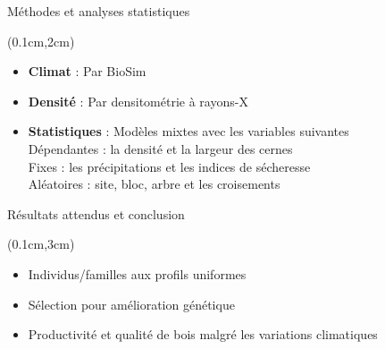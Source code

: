 \documentclass{beamer}
\begin{document}

\begin{frame}{Méthodes et analyses statistiques}
	
\begin{textblock*}{12cm}(0.1cm,2cm)
	\begin{itemize} %
		\item \textbf{Climat} : Par BioSim \\
		\vspace{0.5cm}
		\item \textbf{Densité} : Par densitométrie à rayons-X  \\
		\vspace{0.5cm}
		\item \textbf{Statistiques} : Modèles mixtes avec les variables suivantes\\
		\vspace{0.2cm}
		Dépendantes : la densité et la largeur des cernes\\
		\vspace{0.2cm}
		Fixes : les précipitations et les indices de sécheresse \\
		\vspace{0.2cm}
        Aléatoires : site, bloc, arbre et les croisements
		
	\end{itemize}
\end{textblock*}
	
\end{frame}

\begin{frame}{Résultats attendus et conclusion}
	
	\begin{textblock*}{12cm}(0.1cm,3cm)
		\begin{itemize} %
			\item Individus/familles aux profils uniformes \\
			\vspace{0.7cm}
			\item Sélection pour amélioration génétique  \\
			\vspace{0.7cm}
			\item Productivité et qualité de bois malgré les variations climatiques\\
		\end{itemize}
	\end{textblock*}
	
\end{frame}
\end{document}
